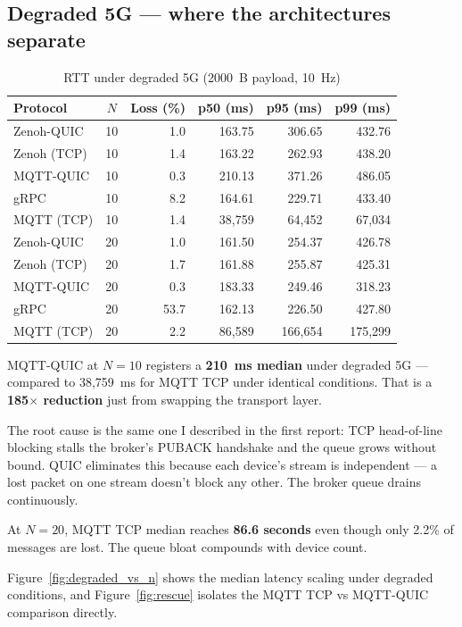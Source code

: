 \documentclass[11pt,a4paper]{article}
\begin{document}
\subsection{Degraded 5G --- where the architectures separate}

\begin{table}[H]
\centering
\caption{RTT under degraded 5G (2000~B payload, 10~Hz)}
\label{tab:degraded}
\begin{tabular}{lcrrrr}
\toprule
Protocol & $N$ & Loss (\%) & p50 (ms) & p95 (ms) & p99 (ms) \\
\midrule
Zenoh-QUIC  & 10 & 1.0 & 163.75     & 306.65     & 432.76 \\
Zenoh (TCP) & 10 & 1.4 & 163.22     & 262.93     & 438.20 \\
MQTT-QUIC   & 10 & 0.3 & 210.13     & 371.26     & 486.05 \\
gRPC        & 10 & 8.2 & 164.61     & 229.71     & 433.40 \\
MQTT (TCP)  & 10 & 1.4 & 38{,}759   & 64{,}452   & 67{,}034 \\
\midrule
Zenoh-QUIC  & 20 & 1.0 & 161.50     & 254.37     & 426.78 \\
Zenoh (TCP) & 20 & 1.7 & 161.88     & 255.87     & 425.31 \\
MQTT-QUIC   & 20 & 0.3 & 183.33     & 249.46     & 318.23 \\
gRPC        & 20 & 53.7& 162.13     & 226.50     & 427.80 \\
MQTT (TCP)  & 20 & 2.2 & 86{,}589   & 166{,}654  & 175{,}299 \\
\bottomrule
\end{tabular}
\end{table}

MQTT-QUIC at $N=10$ registers a \textbf{210~ms median} under degraded 5G --- compared to 38,759~ms for MQTT TCP under identical conditions. That is a \textbf{185$\times$ reduction} just from swapping the transport layer.

The root cause is the same one I described in the first report: TCP head-of-line blocking stalls the broker's PUBACK handshake and the queue grows without bound. QUIC eliminates this because each device's stream is independent --- a lost packet on one stream doesn't block any other. The broker queue drains continuously.

At $N=20$, MQTT TCP median reaches \textbf{86.6 seconds} even though only 2.2\% of messages are lost. The queue bloat compounds with device count.

Figure~\ref{fig:degraded_vs_n} shows the median latency scaling under degraded conditions, and Figure~\ref{fig:rescue} isolates the MQTT TCP vs MQTT-QUIC comparison directly.
\end{document}
